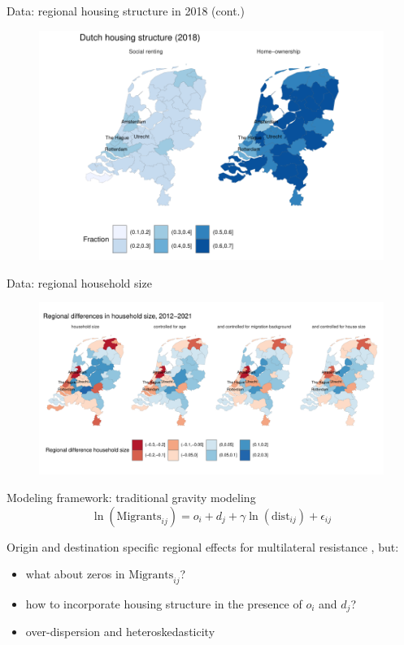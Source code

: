 \documentclass{beamer}
\begin{document}
\begin{frame}{Data: regional housing structure in 2018 (cont.)}
		\begin{figure}
		  \includegraphics[width=1\textwidth]{../../fig/housing_structure}
		  \end{figure}
\end{frame}

\begin{frame}{Data: regional household size}
	\begin{figure}
		  \includegraphics[width=1\textwidth]{../../fig/hhsize_corop}
		  \end{figure}
\end{frame}


\begin{frame}{Modeling framework: traditional gravity modeling}
	\begin{equation*}
	\ln(\text{Migrants}_{ij}) = o_i + d_j + \gamma\ln(\text{dist}_{ij}) + \epsilon_{ij}
	\label{eq:gravfixed}
	\end{equation*} 
	
	Origin and destination specific \alert{regional} effects for multilateral resistance  \citep{anderson2003gravity}, but:
	\begin{itemize}
		\item what about \alert{zeros} in $\text{Migrants}_{ij}$?
		\item how to incorporate \alert{housing} structure in the presence of $o_i$ and $d_j$?
		\item \alert{over-dispersion} and \alert{heteroskedasticity} \footnotesize{\citep{silva2006log} }
	\end{itemize}
\end{frame}
\end{document}
